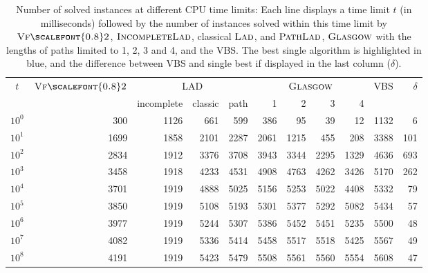 \documentclass{llncs}
\newcommand{\VFtwo}{$\textsc{Vf{\scalefont{0.8}2}}$\xspace}
\newcommand{\Glasgow}{$\textsc{Glasgow}$\xspace}
\newcommand{\LAD}{$\textsc{Lad}$\xspace}
\newcommand{\IncompleteLAD}{$\textsc{IncompleteLad}$\xspace}
\newcommand{\PathLAD}{$\textsc{PathLad}$\xspace}
\begin{document}
\begin{table}[t]
\begin{center}
\begin{tabular}{|c||r||r|r|r||r|r|r|r||r|r|}
\hline
$t$ & \VFtwo & \multicolumn{3}{c||}{LAD} & \multicolumn{4}{c||}{\Glasgow}& VBS & $\delta$\\
&&incomplete&classic&path&1&2&3&4&&\\\hline
$10^0$ & 300 &  \cellcolor{blue!25}1126 & 661 & 599 & 386 & 95 & 39 & 12 & 1132 & 6\\\hline
$10^1$ & 1699 & 1858 & 2101 &  \cellcolor{blue!25}2287 & 2061 & 1215 & 455 & 208 & 3388 & 101\\\hline
$10^2$ & 2834 & 1912 & 3376 & 3708 &  \cellcolor{blue!25}3943 & 3344 & 2295 & 1329 & 4636 & 693\\\hline
$10^3$ & 3458 & 1918 & 4233 & 4531 &  \cellcolor{blue!25}4908 & 4763 & 4262 & 3426 & 5170 & 262\\\hline
$10^4$ & 3701 & 1919 & 4888 & 5025 & 5156 &  \cellcolor{blue!25}5253 & 5022 & 4408 & 5332 & 79\\\hline
$10^5$ & 3850 & 1919 & 5108 & 5193 & 5301 &  \cellcolor{blue!25}5377 & 5292 & 5082 & 5434 & 57\\\hline
$10^6$ & 3977 & 1919 & 5244 & 5307 & 5386 &  \cellcolor{blue!25}5452 & 5451 & 5235 & 5500 & 48\\\hline
$10^7$ & 4082 & 1919 & 5336 & 5414 & 5458 & 5517 &  \cellcolor{blue!25}5518 & 5425 & 5567 & 49\\\hline
$10^8$ & 4191 & 1919 & 5423 & 5479 & 5508 &  \cellcolor{blue!25}5561 & 5560 & 5554 & 5608 & 47\\\hline
\end{tabular}
\end{center}
\caption{Number of solved instances at different CPU time limits: Each line displays a time limit
$t$ (in milliseconds) followed by the number of instances solved within this time limit by \VFtwo,
\IncompleteLAD, classical \LAD, and \PathLAD, \Glasgow with the lengths of paths limited to 1, 2, 3 and
4, and the VBS. The best single algorithm is highlighted in blue, and the difference between VBS and
single best if displayed in the last column ($\delta$).\label{expTimeTable}}
\end{table}
\end{document}

